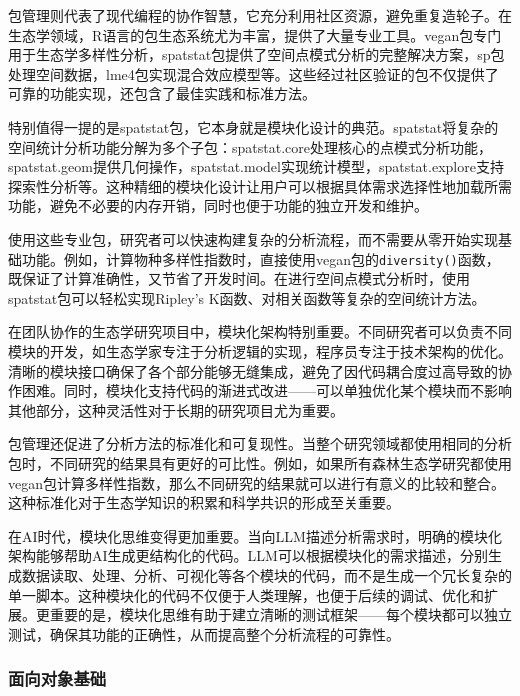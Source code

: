 \documentclass[
]{book}
\begin{document}
包管理则代表了现代编程的协作智慧，它充分利用社区资源，避免重复造轮子。在生态学领域，R语言的包生态系统尤为丰富，提供了大量专业工具。vegan包专门用于生态学多样性分析，spatstat包提供了空间点模式分析的完整解决方案，sp包处理空间数据，lme4包实现混合效应模型等。这些经过社区验证的包不仅提供了可靠的功能实现，还包含了最佳实践和标准方法。

特别值得一提的是spatstat包，它本身就是模块化设计的典范。spatstat将复杂的空间统计分析功能分解为多个子包：spatstat.core处理核心的点模式分析功能，spatstat.geom提供几何操作，spatstat.model实现统计模型，spatstat.explore支持探索性分析等。这种精细的模块化设计让用户可以根据具体需求选择性地加载所需功能，避免不必要的内存开销，同时也便于功能的独立开发和维护。

使用这些专业包，研究者可以快速构建复杂的分析流程，而不需要从零开始实现基础功能。例如，计算物种多样性指数时，直接使用vegan包的\texttt{diversity()}函数，既保证了计算准确性，又节省了开发时间。在进行空间点模式分析时，使用spatstat包可以轻松实现Ripley's K函数、对相关函数等复杂的空间统计方法。

在团队协作的生态学研究项目中，模块化架构特别重要。不同研究者可以负责不同模块的开发，如生态学家专注于分析逻辑的实现，程序员专注于技术架构的优化。清晰的模块接口确保了各个部分能够无缝集成，避免了因代码耦合度过高导致的协作困难。同时，模块化支持代码的渐进式改进------可以单独优化某个模块而不影响其他部分，这种灵活性对于长期的研究项目尤为重要。

包管理还促进了分析方法的标准化和可复现性。当整个研究领域都使用相同的分析包时，不同研究的结果具有更好的可比性。例如，如果所有森林生态学研究都使用vegan包计算多样性指数，那么不同研究的结果就可以进行有意义的比较和整合。这种标准化对于生态学知识的积累和科学共识的形成至关重要。

在AI时代，模块化思维变得更加重要。当向LLM描述分析需求时，明确的模块化架构能够帮助AI生成更结构化的代码。LLM可以根据模块化的需求描述，分别生成数据读取、处理、分析、可视化等各个模块的代码，而不是生成一个冗长复杂的单一脚本。这种模块化的代码不仅便于人类理解，也便于后续的调试、优化和扩展。更重要的是，模块化思维有助于建立清晰的测试框架------每个模块都可以独立测试，确保其功能的正确性，从而提高整个分析流程的可靠性。

\hypertarget{ux9762ux5411ux5bf9ux8c61ux57faux7840}{%
\subsubsection{面向对象基础}\label{ux9762ux5411ux5bf9ux8c61ux57faux7840}}
\end{document}
